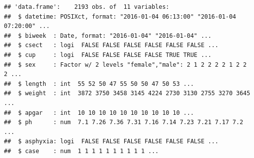 \documentclass[
]{book}
\newenvironment{Shaded}{\begin{snugshade}}{\end{snugshade}}
\newcommand{\AttributeTok}[1]{\textcolor[rgb]{0.13,0.29,0.53}{#1}}
\newcommand{\CommentTok}[1]{\textcolor[rgb]{0.56,0.35,0.01}{\textit{#1}}}
\newcommand{\DecValTok}[1]{\textcolor[rgb]{0.00,0.00,0.81}{#1}}
\newcommand{\FunctionTok}[1]{\textcolor[rgb]{0.13,0.29,0.53}{\textbf{#1}}}
\newcommand{\NormalTok}[1]{#1}
\newcommand{\OtherTok}[1]{\textcolor[rgb]{0.56,0.35,0.01}{#1}}
\newcommand{\SpecialCharTok}[1]{\textcolor[rgb]{0.81,0.36,0.00}{\textbf{#1}}}
\newcommand{\StringTok}[1]{\textcolor[rgb]{0.31,0.60,0.02}{#1}}
\begin{document}
\begin{Shaded}
\end{Shaded}

\begin{verbatim}
## 'data.frame':    2193 obs. of  11 variables:
##  $ datetime: POSIXct, format: "2016-01-04 06:13:00" "2016-01-04 07:20:00" ...
##  $ biweek  : Date, format: "2016-01-04" "2016-01-04" ...
##  $ csect   : logi  FALSE FALSE FALSE FALSE FALSE FALSE ...
##  $ cup     : logi  FALSE FALSE FALSE FALSE TRUE TRUE ...
##  $ sex     : Factor w/ 2 levels "female","male": 2 1 2 2 2 2 1 2 2 2 ...
##  $ length  : int  55 52 50 47 55 50 50 47 50 53 ...
##  $ weight  : int  3872 3750 3458 3145 4224 2730 3130 2755 3270 3645 ...
##  $ apgar   : int  10 10 10 10 10 10 10 10 10 10 ...
##  $ ph      : num  7.1 7.26 7.36 7.31 7.16 7.14 7.23 7.21 7.17 7.2 ...
##  $ asphyxia: logi  FALSE FALSE FALSE FALSE FALSE FALSE ...
##  $ case    : num  1 1 1 1 1 1 1 1 1 1 ...
\end{verbatim}
\end{document}

